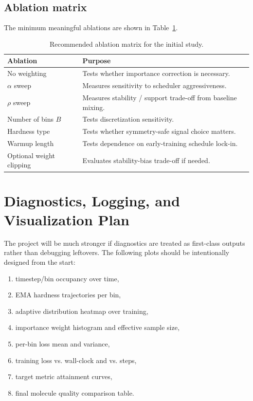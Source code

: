 \documentclass[11pt]{report}
\begin{document}
\section{Ablation matrix}

The minimum meaningful ablations are shown in Table~\ref{tab:ablations}.

\begin{table}[H]
    \centering
    \caption{Recommended ablation matrix for the initial study.}
    \label{tab:ablations}
    \begin{tabular}{p{}p{}}
        \toprule
        \textbf{Ablation} & \textbf{Purpose} \\
        \midrule
        No weighting & Tests whether importance correction is necessary. \\
        $\alpha$ sweep & Measures sensitivity to scheduler aggressiveness. \\
        $\rho$ sweep & Measures stability / support trade-off from baseline mixing. \\
        Number of bins $B$ & Tests discretization sensitivity. \\
        Hardness type & Tests whether symmetry-safe signal choice matters. \\
        Warmup length & Tests dependence on early-training schedule lock-in. \\
        Optional weight clipping & Evaluates stability-bias trade-off if needed. \\
        \bottomrule
    \end{tabular}
\end{table}

\chapter{Diagnostics, Logging, and Visualization Plan}

The project will be much stronger if diagnostics are treated as first-class outputs rather than debugging leftovers. The following plots should be intentionally designed from the start:

\begin{enumerate}[leftmargin=2em]
    \item timestep/bin occupancy over time,
    \item EMA hardness trajectories per bin,
    \item adaptive distribution heatmap over training,
    \item importance weight histogram and effective sample size,
    \item per-bin loss mean and variance,
    \item training loss vs. wall-clock and vs. steps,
    \item target metric attainment curves,
    \item final molecule quality comparison table.
\end{enumerate}
\end{document}
